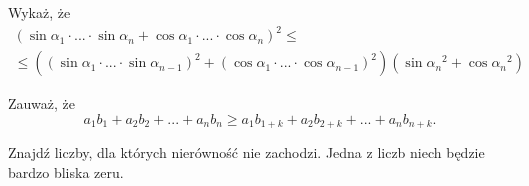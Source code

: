 
\begin{hints_list}
	\item *
	\item *
	\item Wykaż, że
\begin{gather*}
	\left(\sin{\alpha_1}\cdot ... \cdot \sin{\alpha_n}  + \cos{\alpha_1}\cdot ... \cdot \cos{\alpha_n}\right)^2  \leqslant \\
	\leqslant
	 \left((\sin{\alpha_1}\cdot ... \cdot \sin{\alpha_{n - 1}})^2+ (\cos{\alpha_1}\cdot ... \cdot \cos{\alpha_{n - 1}})^2\right) (\sin{\alpha_n}^2 + \cos{\alpha_n}^2)
\end{gather*}
	\item Zauważ, że
	\[
		a_1b_1 + a_2b_2 + ... + a_nb_n \geqslant a_1b_{1 + k} + a_2b_{2 + k} + ... + a_nb_{n + k}.
	\]
	\item Znajdź liczby, dla których nierówność nie zachodzi. Jedna z liczb niech będzie bardzo bliska zeru.
\end{hints_list}